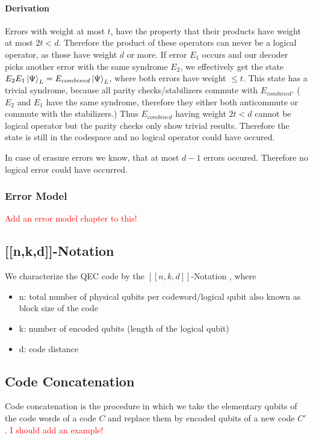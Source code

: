 \paragraph{Derivation}
Errors with weight at most $t$, have the property that their products have weight at most $2t<d$.
Therefore the product of these operators can never be a logical operator, as those have weight $d$ or more. 
If error $E_1$ occurs and our decoder picks another error with the same syndrome $E_2$, 
we effectively get the state $E_2 E_1 \ket{\Psi}_L = E_{combined} \ket{\Psi}_L$, where both errors have weight $\leq t$.
This state has a trivial syndrome, because all parity checks/stabilizers commute with $E_{combined}$.
($E_2$ and $E_1$ have the same syndrome, therefore they either both anticommute or commute with the stabilizers.) 
Thus $E_{combined}$ having weight $2t<d$ cannot be logical operator but the parity checks only show trivial results. 
Therefore the state is still in the codespace and no logical operator could have occured.\cite{QECmemory}

In case of erasure errors we know, that at most $d-1$ errors occured.
Therefore no logical error could have occurred. 

\subsubsection{Error Model}
\textcolor{red}{Add an error model chapter to this!}


\subsection{[[n,k,d]]-Notation}\label{sssec:nkd_notation}
We characterize the QEC code by the $[[n,k,d]]$-Notation \cite{QECintro}, where 
\begin{itemize}
    \item n: total number of physical qubits per codeword/logical qubit 
    \subitem also known as block size of the code \cite{QECmemory}
    \item k: number of encoded qubits (length of the logical qubit)
    \item d: code distance
\end{itemize}


\subsection{Code Concatenation}
Code concatenation is the procedure in which we take the elementary qubits of the code words of a code $C$ 
and replace them by encoded qubits of a new code $C'$. \cite{QECmemory}
\textcolor{red}{I should add an example!}


